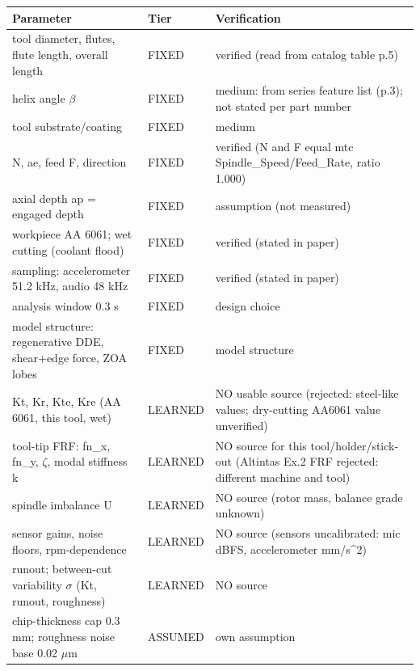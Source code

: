 \begin{tabular}{p{5.2cm}p{1.8cm}p{6.5cm}}
\toprule
Parameter & Tier & Verification \\
\midrule
tool diameter, flutes, flute length, overall length & FIXED & verified (read from catalog table p.5) \\
helix angle $\beta$ & FIXED & medium: from series feature list (p.3); not stated per part number \\
tool substrate/coating & FIXED & medium \\
N, ae, feed F, direction & FIXED & verified (N and F equal mtc Spindle\_Speed/Feed\_Rate, ratio 1.000) \\
axial depth ap = engaged depth & FIXED & assumption (not measured) \\
workpiece AA 6061; wet cutting (coolant flood) & FIXED & verified (stated in paper) \\
sampling: accelerometer 51.2 kHz, audio 48 kHz & FIXED & verified (stated in paper) \\
analysis window 0.3 s & FIXED & design choice \\
model structure: regenerative DDE, shear+edge force, ZOA lobes & FIXED & model structure \\
\midrule
Kt, Kr, Kte, Kre (AA 6061, this tool, wet) & LEARNED & NO usable source (rejected: steel-like values; dry-cutting AA6061 value unverified) \\
tool-tip FRF: fn\_x, fn\_y, $\zeta$, modal stiffness k & LEARNED & NO source for this tool/holder/stick-out (Altintas Ex.2 FRF rejected: different machine and tool) \\
spindle imbalance U & LEARNED & NO source (rotor mass, balance grade unknown) \\
sensor gains, noise floors, rpm-dependence & LEARNED & NO source (sensors uncalibrated: mic dBFS, accelerometer mm/s\^{}2) \\
runout; between-cut variability $\sigma$ (Kt, runout, roughness) & LEARNED & NO source \\
\midrule
chip-thickness cap 0.3 mm; roughness noise base 0.02 $\mu$m & ASSUMED & own assumption \\
\bottomrule
\end{tabular}
